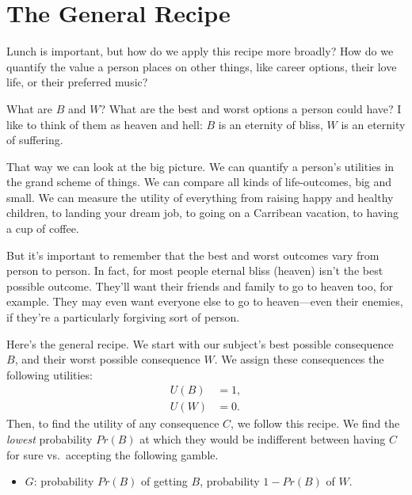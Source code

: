 \documentclass[justified]{tufte-book}
\providecommand{\tightlist}{%
  \setlength{\itemsep}{0pt}\setlength{\parskip}{0pt}}
\renewcommand{\u}{U}
\newcommand{\p}{Pr}
\theoremstyle{definition}
\theoremstyle{definition}
\theoremstyle{definition}
\theoremstyle{definition}
\theoremstyle{remark}
\begin{document}
\hypertarget{the-general-recipe}{%
\section{The General Recipe}\label{the-general-recipe}}

Lunch is important, but how do we apply this recipe more broadly? How do we quantify the value a person places on other things, like career options, their love life, or their preferred music?

\begin{marginfigure}
What are \(B\) and \(W\)? What are the best and worst options a person
could have? I like to think of them as heaven and hell: \(B\) is an
eternity of bliss, \(W\) is an eternity of suffering.

That way we can look at the big picture. We can quantify a person's
utilities in the grand scheme of things. We can compare all kinds of
life-outcomes, big and small. We can measure the utility of everything
from raising happy and healthy children, to landing your dream job, to
going on a Carribean vacation, to having a cup of coffee.

But it's important to remember that the best and worst outcomes vary
from person to person. In fact, for most people eternal bliss (heaven)
isn't the best possible outcome. They'll want their friends and family
to go to heaven too, for example. They may even want everyone else to go
to heaven---even their enemies, if they're a particularly forgiving sort
of person.
\end{marginfigure}

Here's the general recipe. We start with our subject's best possible consequence \(B\), and their worst possible consequence \(W\). We assign these consequences the following utilities:
\[
  \begin{aligned}
    \u(B) &= 1,\\
    \u(W) &= 0.
  \end{aligned}
\]
Then, to find the utility of any consequence \(C\), we follow this recipe. We find the \emph{lowest} probability \(\p(B)\) at which they would be indifferent between having \(C\) for sure vs.~accepting the following gamble.

\begin{itemize}
\tightlist
\item
  \(G\): probability \(\p(B)\) of getting \(B\), probability \(1-\p(B)\) of \(W\).
\end{itemize}
\end{document}
